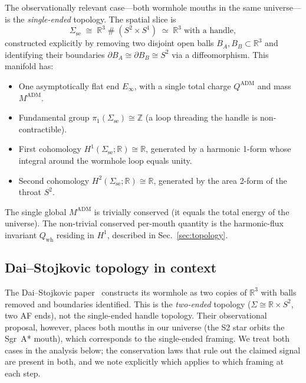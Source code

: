 \documentclass[aps,prd,onecolumn,nofootinbib,superscriptaddress]{revtex4-2}
\begin{document}
The observationally relevant case---both wormhole mouths in the same universe---is
the \emph{single-ended} topology.  The spatial slice is
\begin{equation}
  \Sigma_{\mathrm{se}} \;\cong\; \mathbb{R}^3\;\#\;(S^2\times S^1)
  \;\simeq\; \mathbb{R}^3\;\text{with a handle},
\end{equation}
constructed explicitly by removing two disjoint open balls $B_A,B_B\subset\mathbb{R}^3$
and identifying their boundaries $\partial B_A\cong\partial B_B\cong S^2$ via
a diffeomorphism.  This manifold has:
\begin{itemize}
  \item One asymptotically flat end $E_\infty$, with a single total charge
    $Q^{\mathrm{ADM}}$ and mass $M^{\mathrm{ADM}}$.
  \item Fundamental group $\pi_1(\Sigma_{\mathrm{se}})\cong\mathbb{Z}$
    (a loop threading the handle is non-contractible).
  \item First cohomology $H^1(\Sigma_{\mathrm{se}};\mathbb{R})\cong\mathbb{R}$,
    generated by a harmonic 1-form whose integral around the wormhole loop
    equals unity.
  \item Second cohomology $H^2(\Sigma_{\mathrm{se}};\mathbb{R})\cong\mathbb{R}$,
    generated by the area 2-form of the throat $S^2$.
\end{itemize}

The single global $M^{\mathrm{ADM}}$ is trivially conserved (it equals the
total energy of the universe).  The non-trivial conserved per-mouth quantity is
the harmonic-flux invariant $Q_{\mathrm{wh}}$ residing in $H^1$, described in
Sec.~\ref{sec:topology}.

\subsection{Dai--Stojkovic topology in context}

The Dai--Stojkovic paper~\cite{DaiStojkovic2019Observing} constructs its
wormhole as two copies of $\mathbb{R}^3$ with balls removed and boundaries
identified.  This is the \emph{two-ended} topology ($\Sigma\cong\mathbb{R}\times
S^2$, two AF ends), not the single-ended handle topology.  Their observational
proposal, however, places both mouths in our universe (the S2 star orbits the
Sgr~A* mouth), which corresponds to the single-ended framing.  We treat both
cases in the analysis below; the conservation laws that rule out the claimed
signal are present in both, and we note explicitly which applies to which
framing at each step.
\end{document}
